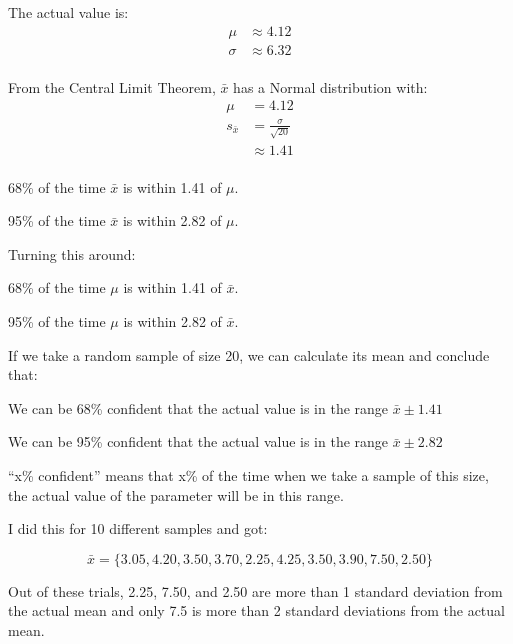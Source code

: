 \documentclass[landscape]{exam}
\begin{document}
  The actual value is:
  \begin{align*}
    \mu    & \approx 4.12 \\
    \sigma & \approx 6.32 \\
  \end{align*}

  From the Central Limit Theorem, $\bar{x}$ has a Normal distribution with:
  \begin{align*}
    \mu         & = 4.12 \\
    s_{\bar{x}} & = \frac{\sigma}{\sqrt{20}} \\
                & \approx 1.41 \\
  \end{align*}

  \begin{itemize*}
    \item 68\% of the time $\bar{x}$ is within 1.41 of $\mu$.
    \item 95\% of the time $\bar{x}$ is within 2.82 of $\mu$.
  \end{itemize*}

  Turning this around:
  \begin{itemize*}
    \item 68\% of the time $\mu$ is within 1.41 of $\bar{x}$.
    \item 95\% of the time $\mu$ is within 2.82 of $\bar{x}$.
  \end{itemize*}

  If we take a random sample of size 20, we can calculate its mean and conclude
  that:
  \begin{itemize*}
    \item We can be 68\% confident that the actual value is in the range
      $\bar{x} \pm 1.41$
    \item We can be 95\% confident that the actual value is in the range
      $\bar{x} \pm 2.82$
  \end{itemize*}

  ``x\% confident'' means that x\% of the time when we take a sample of this
  size, the actual value of the parameter will be in this range.

  I did this for 10 different samples and got:

  \[
    \bar{x} = \{ 3.05, 4.20, 3.50, 3.70, 2.25, 4.25, 3.50, 3.90, 7.50, 2.50 \}
  \]

  Out of these trials, 2.25, 7.50, and 2.50 are more than 1 standard deviation
  from the actual mean and only 7.5 is more than 2 standard deviations from the
  actual mean.
\end{document}
